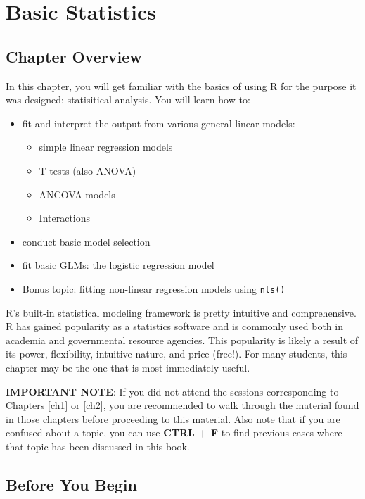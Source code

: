 \documentclass[]{book}
\providecommand{\tightlist}{%
  \setlength{\itemsep}{0pt}\setlength{\parskip}{0pt}}
\theoremstyle{definition}
\theoremstyle{definition}
\theoremstyle{definition}
\theoremstyle{remark}
\begin{document}
\chapter{Basic Statistics}\label{ch3}

\section*{Chapter Overview}\label{chapter-overview-2}

In this chapter, you will get familiar with the basics of using R for
the purpose it was designed: statisitical analysis. You will learn how
to:

\begin{itemize}
\tightlist
\item
  fit and interpret the output from various general linear models:

  \begin{itemize}
  \tightlist
  \item
    simple linear regression models
  \item
    T-tests (also ANOVA)
  \item
    ANCOVA models
  \item
    Interactions
  \end{itemize}
\item
  conduct basic model selection
\item
  fit basic GLMs: the logistic regression model
\item
  Bonus topic: fitting non-linear regression models using \texttt{nls()}
\end{itemize}

R's built-in statistical modeling framework is pretty intuitive and
comprehensive. R has gained popularity as a statistics software and is
commonly used both in academia and governmental resource agencies. This
popularity is likely a result of its power, flexibility, intuitive
nature, and price (free!). For many students, this chapter may be the
one that is most immediately useful.

\textbf{IMPORTANT NOTE}: If you did not attend the sessions
corresponding to Chapters \ref{ch1} or \ref{ch2}, you are recommended to
walk through the material found in those chapters before proceeding to
this material. Also note that if you are confused about a topic, you can
use \textbf{CTRL + F} to find previous cases where that topic has been
discussed in this book.

\section*{Before You Begin}\label{before-you-begin-1}
\end{document}
